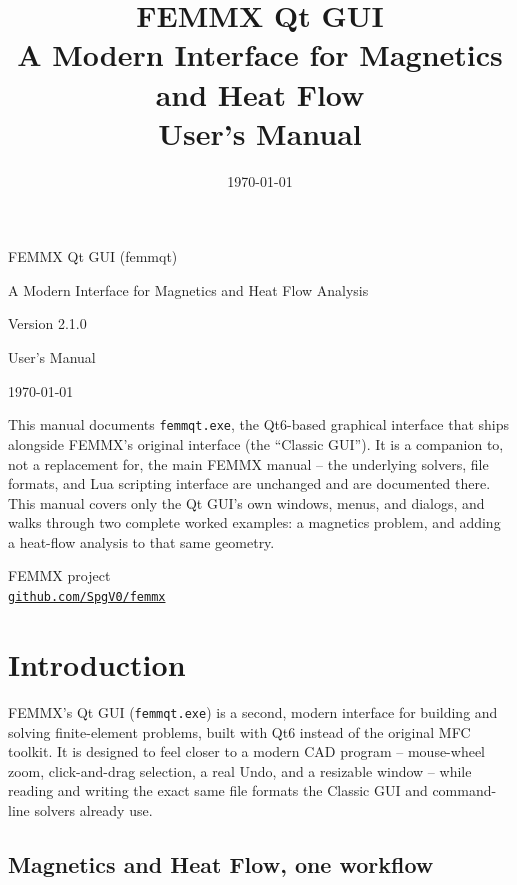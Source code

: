 \documentclass[11pt]{report}
\title{\LARGE FEMMX Qt GUI\\[8pt]\Large A Modern Interface for Magnetics and Heat Flow\\[8pt]\large User's Manual}
\author{}
\date{\today}
\begin{document}
\begin{titlepage}
\centering
\vspace*{2in}
{\LARGE FEMMX Qt GUI (femmqt)\par}
\vspace{16pt}
{\Large A Modern Interface for Magnetics and Heat Flow Analysis\par}
\vspace{24pt}
{\large Version 2.1.0\par}
\vspace{8pt}
{\large User's Manual\par}
\vspace{16pt}
\today
\vspace{48pt}

\begin{minipage}{0.8\textwidth}
\centering
\small
This manual documents \texttt{femmqt.exe}, the Qt6-based graphical
interface that ships alongside FEMMX's original interface (the
``Classic GUI''). It is a companion to, not a replacement for, the main
FEMMX manual -- the underlying solvers, file formats, and Lua scripting
interface are unchanged and are documented there. This manual covers
only the Qt GUI's own windows, menus, and dialogs, and walks through
two complete worked examples: a magnetics problem, and adding a
heat-flow analysis to that same geometry.
\end{minipage}

\vfill
FEMMX project \\
\href{https://github.com/SpgV0/femmx}{\tt github.com/SpgV0/femmx}
\end{titlepage}

\tableofcontents

\chapter{Introduction}

FEMMX's Qt GUI (\texttt{femmqt.exe}) is a second, modern interface for
building and solving finite-element problems, built with Qt6 instead of
the original MFC toolkit. It is designed to feel closer to a modern CAD
program -- mouse-wheel zoom, click-and-drag selection, a real Undo, and
a resizable window -- while reading and writing the exact same file
formats the Classic GUI and command-line solvers already use.

\section{Magnetics and Heat Flow, one workflow}
\end{document}
